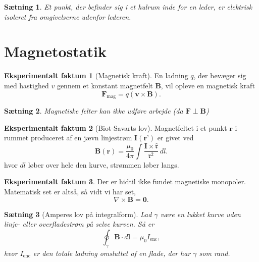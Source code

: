 \documentclass[]{article}
\newcommand{\fr}{\mathfrak{r}}
\newcommand{\hfr}{\hat{\mathfrak{r}}}
\newtheorem{theorem}{Sætning}
\theoremstyle{definition}
\newtheorem{experimental}{Eksperimentalt faktum}
\newcommand{\Ienc}{I_\text{enc}}
\begin{document}
\begin{theorem}
	Et punkt, der befinder sig i et hulrum inde for en leder, er elektrisk isoleret fra omgivelserne udenfor lederen.
\end{theorem}

\section{Magnetostatik}
\begin{experimental}[Magnetisk kraft]
	En ladning $q$, der bevæger sig med hastighed $v$ gennem et konstant magnetfelt $\mathbf{B}$, vil opleve en magnetisk kraft
	\begin{equation*}
		\mathbf{F}_\text{mag} = q(\mathbf{v} \times \mathbf{B}).
	\end{equation*}
\end{experimental}
\begin{theorem}
	Magnetiske felter kan ikke udføre arbejde (da $\mathbf{F} \perp \mathbf{B}$)
\end{theorem}

\begin{experimental}[Biot-Savarts lov]
	Magnetfeltet i et punkt $\mathbf{r}$ i rummet produceret af en jævn linjestrøm $\mathbf{I}(\textbf{r'})$ er givet ved
	\begin{equation*}
		\mathbf{B}(\mathbf{r}) = \frac{\mu_0}{4 \pi} \int{\frac{\mathbf{I} \times \hfr}{\fr^2}} \ dl.
	\end{equation*}
	hvor $dl$ løber over hele den kurve, strømmen løber langs.
\end{experimental}

\begin{experimental}
	Der er hidtil ikke fundet magnetiske monopoler. Matematisk set er altså, så vidt vi har set,
	\begin{equation*}
		\nabla \times \mathbf{B} = \mathbf{0}.
	\end{equation*}
\end{experimental}

\begin{theorem}[Amperes lov på integralform]
	Lad $\gamma$ være en lukket kurve uden linje- eller overfladestrøm på selve kurven. Så er
	\begin{equation*}
		\oint_\gamma \mathbf{B} \cdot d \mathbf{l} = \mu_0 \Ienc, 
	\end{equation*}
	hvor $\Ienc$ er den totale ladning omsluttet af en flade, der har $\gamma$ som rand.
\end{theorem}
\end{document}
